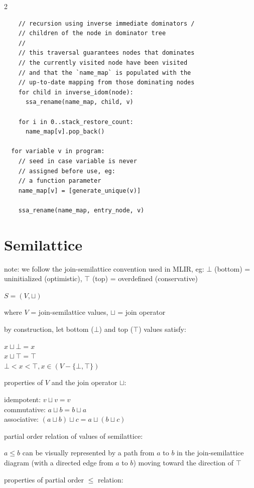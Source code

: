 \documentclass[8pt]{extarticle}
\begin{document}
\begin{multicols*}{2}
\begin{verbatim}
    // recursion using inverse immediate dominators /
    // children of the node in dominator tree
    //
    // this traversal guarantees nodes that dominates
    // the currently visited node have been visited
    // and that the `name_map` is populated with the
    // up-to-date mapping from those dominating nodes
    for child in inverse_idom(node):
      ssa_rename(name_map, child, v)

    for i in 0..stack_restore_count:
      name_map[v].pop_back()

  for variable v in program:
    // seed in case variable is never
    // assigned before use, eg:
    // a function parameter
    name_map[v] = [generate_unique(v)]

    ssa_rename(name_map, entry_node, v)
  \end{verbatim}
  
  \vfill\null
  \columnbreak

  \section{Semilattice}

  note: we follow the join-semilattice convention used in MLIR, eg: $\bot$ (bottom) = uninitialized (optimistic), $\top$ (top) = overdefined (conservative)

  $S = (V, \sqcup)$

  where $V$ = join-semilattice values, $\sqcup$ = join operator

  by construction, let bottom ($\bot$) and top ($\top$) values satisfy:
  
  $x \sqcup \bot = x$\\
  $x \sqcup \top = \top$\\
  $\bot < x < \top, x \in (V - \{ \bot, \top \})$
  
  properties of $V$ and the join operator $\sqcup$:

  idempotent: $v \sqcup v = v$\\ 
  commutative: $a \sqcup b = b \sqcup a$\\
  associative: $(a \sqcup b) \sqcup c = a \sqcup (b \sqcup c)$

  partial order relation of values of semilattice:

  $a \leq b$ can be visually represented by a path from $a$ to $b$ in the join-semilattice diagram (with a directed edge from $a$ to $b$) moving toward the direction of $\top$

  properties of partial order $\leq$ relation:


\end{multicols*}
\end{document}
